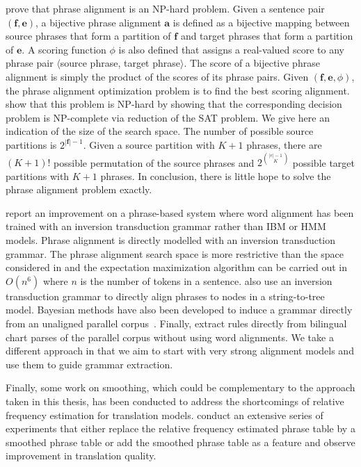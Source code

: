 \citet{denero-klein:2008:ACL} prove that phrase alignment is an
NP-hard problem. Given a sentence pair $(\bm{f}, \bm{e})$, a bijective phrase
alignment $\bm{a}$ is defined as a bijective mapping between source phrases that
form a partition of $\bm{f}$ and target phrases that form a partition of
$\bm{e}$. A scoring function $\phi$ is also defined that assigns a real-valued
score to any phrase pair $\langle$source phrase, target phrase$\rangle$. The score of a
bijective phrase alignment is simply the product of the scores of its phrase pairs.
Given $(\bm{f}, \bm{e}, \phi)$, the phrase alignment optimization problem is to find
the best scoring alignment. \citet{denero-klein:2008:ACL} show that this problem
is NP-hard by showing that the corresponding decision problem is NP-complete via
reduction of the SAT problem. We give here an indication of the size of the search
space. The number of possible source partitions is $2^{|\bm{f}| - 1}$.
Given a source partition with $K + 1$ phrases, there are $(K + 1)!$ possible
permutation of the source phrases and $2^{{|e| - 1} \choose K}$ possible target
partitions with $K+1$ phrases. In conclusion, there is little hope to solve
the phrase alignment problem exactly.

\citet{saers-wu:2009:SSST} report an
improvement on a phrase-based system where word alignment has been trained with
an inversion transduction grammar rather than IBM or HMM models.
Phrase alignment is directly modelled with an inversion transduction
grammar. The phrase alignment search space is more restrictive than
the space considered in \citet{denero-klein:2008:ACL} and the
expectation maximization algorithm can be carried out in $O(n^6)$
where $n$ is the number of tokens in a sentence.
\citet{pauls-klein-chiang-knight:2010:NAACL} also use an
inversion transduction grammar to directly align phrases to nodes in a
string-to-tree model. Bayesian methods have also been developed to induce a
grammar directly from an unaligned parallel
corpus~\citep{blunsom-cohn-osborne:2008:NIPS,blunsom-cohn-dyer-osborne:2009:ACL}.
Finally, \citet{Cmejrek2009} extract rules directly from
bilingual chart parses of the parallel corpus without using word alignments.
We take a different approach in that we aim to start with very strong alignment
models and use them to guide grammar extraction.

Finally, some work on smoothing, which could be complementary to the approach taken
in this thesis, has been conducted to address the
shortcomings of relative frequency estimation for translation models.
\citet{foster-kuhn-johnson:2006:EMNLP} conduct an extensive series of
experiments that either replace the relative frequency estimated phrase table by
a smoothed phrase table or add the smoothed phrase table as a feature and
observe improvement in translation quality.

